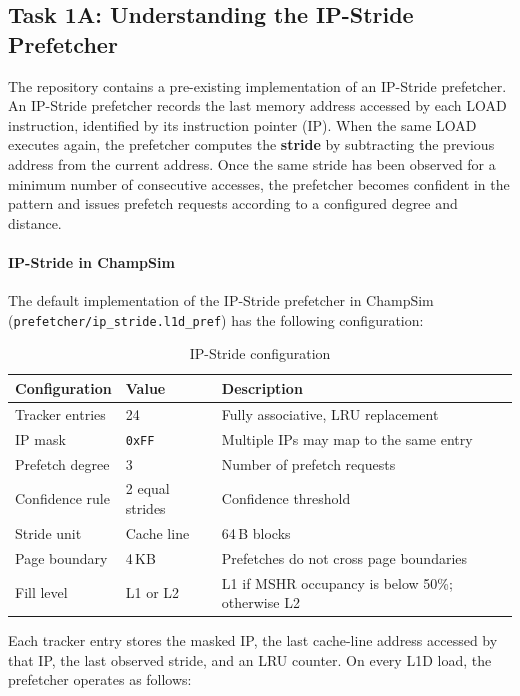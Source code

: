 \documentclass[11pt,a4paper]{article}
\begin{document}
\subsection{Task 1A: Understanding the IP-Stride Prefetcher}

The repository contains a pre-existing implementation of an IP-Stride
prefetcher. An IP-Stride prefetcher records the last memory address
accessed by each LOAD instruction, identified by its instruction
pointer (IP). When the same LOAD executes again, the prefetcher
computes the \textbf{stride} by subtracting the previous address from
the current address. Once the same stride has been observed for a
minimum number of consecutive accesses, the prefetcher becomes
confident in the pattern and issues prefetch requests according to
a configured degree and distance.

\paragraph{IP-Stride in ChampSim}

The default implementation of the IP-Stride prefetcher in ChampSim
(\texttt{prefetcher/ip\_stride.l1d\_pref}) has the following
configuration:

\begin{table}[htbp]
  \centering
  \caption{IP-Stride configuration}
  \label{tab:ip-stride}
  \begin{tabular}{@{}lll@{}}
    \toprule
    \textbf{Configuration} & \textbf{Value} & \textbf{Description} \\
    \midrule
    Tracker entries & 24 & Fully associative, LRU replacement \\
    IP mask & \texttt{0xFF} & Multiple IPs may map to the same entry \\
    Prefetch degree & 3 & Number of prefetch requests \\
    Confidence rule & 2 equal strides & Confidence threshold \\
    Stride unit & Cache line & 64\,B blocks \\
    Page boundary & 4\,KB & Prefetches do not cross page boundaries \\
    Fill level & L1 or L2 & L1 if MSHR occupancy is below 50\%; otherwise L2 \\
    \bottomrule
  \end{tabular}
\end{table}

Each tracker entry stores the masked IP, the last cache-line address
accessed by that IP, the last observed stride, and an LRU counter.
On every L1D load, the prefetcher operates as follows:
\end{document}
